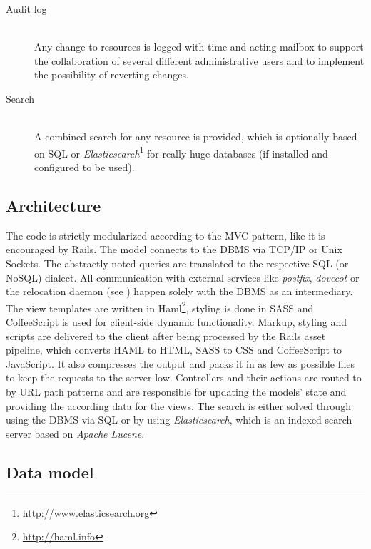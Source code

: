 \documentclass[12pt,a4paper]{scrartcl}
\begin{document}
\begin{description}
				\item[\rm Audit log]\ \\
					Any change to resources is logged with time and acting
					mailbox to support the collaboration of several different
					administrative users and to implement the possibility of
					reverting changes.

				\item[\rm Search]\ \\
					A combined search for any resource is provided, which is
					optionally based on \ac{SQL} or
					\emph{Elasticsearch}\footnote{\url{http://www.elasticsearch.org}}
					for really huge databases (if installed and configured to
					be used).
			\end{description}

		\subsection{Architecture}

			The code is strictly modularized according to the \ac{MVC} pattern,
			like it is encouraged by \ac{Rails}. The model connects to the
			\ac{DBMS} via TCP/IP or Unix Sockets. The abstractly noted queries
			are translated to the respective \ac{SQL} (or NoSQL) dialect. All
			communication with external services like \emph{postfix},
			\emph{dovecot} or the relocation daemon (see
			) happen solely with the
			\ac{DBMS} as an intermediary. The view templates are written in
			Haml\footnote{\url{http://haml.info}}, styling is done in SASS and
			CoffeeScript is used for client-side dynamic functionality. Markup,
			styling and scripts are delivered to the client after being
			processed by the \ac{Rails} asset pipeline, which converts HAML to
			HTML, SASS to CSS and CoffeeScript to JavaScript. It also
			compresses the output and packs it in as few as possible files to
			keep the requests to the server low. Controllers and their actions
			are routed to by URL path patterns and are responsible for updating
			the models' state and providing the according data for the views.
			The search is either solved through using the \ac{DBMS} via
			\ac{SQL} or by using \emph{Elasticsearch}, which is an indexed
			search server based on \emph{Apache Lucene}.

		\subsection{Data model}
\end{document}
